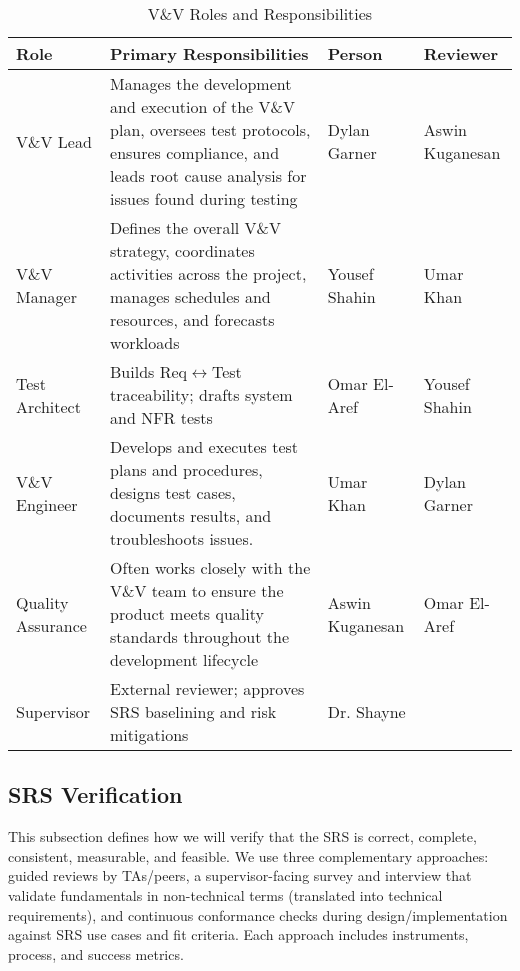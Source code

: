 \documentclass[12pt, titlepage]{article}
\begin{document}
\begin{table}[h]
\centering
\caption{V\&V Roles and Responsibilities}
\begin{adjustbox}{max width=\textwidth,center}
\begin{tabular}{p{3.2cm} p{7.2cm} p{3cm} p{2cm}}
\toprule
\textbf{Role} & \textbf{Primary Responsibilities} & \textbf{Person} & \textbf{Reviewer}\\
\midrule
V\&V Lead & Manages the development and execution of the V\&V plan, oversees test protocols, ensures compliance, and leads root cause analysis for issues found during testing  & Dylan Garner & Aswin Kuganesan\\
V\&V Manager & Defines the overall V\&V strategy, coordinates activities across the project, manages schedules and resources, and forecasts workloads & Yousef Shahin & Umar Khan \\
Test Architect & Builds Req$\leftrightarrow$Test traceability; drafts system and NFR tests & Omar El-Aref & Yousef Shahin \\
V\&V Engineer &  Develops and executes test plans and procedures, designs test cases, documents results, and troubleshoots issues.  & Umar Khan & Dylan Garner \\
Quality Assurance & Often works closely with the V\&V team to ensure the product meets quality standards throughout the development lifecycle & Aswin Kuganesan & Omar El-Aref\\
Supervisor &  External reviewer; approves SRS baselining and risk mitigations & Dr. Shayne &  \\
\bottomrule
\end{tabular}
\end{adjustbox}
\end{table}

\subsection{SRS Verification}

This subsection defines how we will verify that the SRS is correct, complete, consistent, measurable, and feasible. We use three complementary approaches: guided reviews by TAs/peers, a supervisor-facing survey and interview that validate fundamentals in non-technical terms (translated into technical requirements), and continuous conformance checks during design/implementation against SRS use cases and fit criteria. Each approach includes instruments, process, and success metrics.
\end{document}
